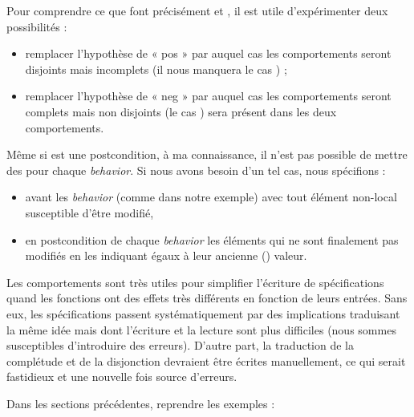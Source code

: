 Pour comprendre ce que font précisément  et , il est utile
d'expérimenter deux possibilités :



\begin{itemize}
\item remplacer l'hypothèse de « pos » par  auquel cas les
comportements seront disjoints mais incomplets (il nous manquera le cas
) ;
\item remplacer l'hypothèse de « neg » par  auquel cas les
comportements seront complets mais non disjoints (le cas ) sera
présent dans les deux comportements.
\end{itemize}


\begin{Warning}
Même si  est une postcondition, à ma connaissance, il n'est pas
possible de mettre des  pour chaque \textit{behavior}. Si nous avons
besoin d'un tel cas, nous spécifions :

\begin{itemize}
\item {} avant les \textit{behavior} (comme dans notre exemple) avec tout
élément non-local susceptible d'être modifié,
\item en postcondition de chaque \textit{behavior} les éléments qui ne sont finalement
pas modifiés en les indiquant égaux à leur ancienne () valeur.
\end{itemize}
\end{Warning}


Les comportements sont très utiles pour simplifier l'écriture de spécifications
quand les fonctions ont des effets très différents en fonction de leurs
entrées. Sans eux, les spécifications passent systématiquement par des
implications traduisant la même idée mais dont l'écriture et la lecture sont
plus difficiles (nous sommes susceptibles d'introduire des erreurs).
D'autre part, la traduction de la complétude et de la disjonction devraient
être écrites manuellement, ce qui serait fastidieux et une nouvelle fois source
d'erreurs.







Dans les sections précédentes, reprendre les exemples :


